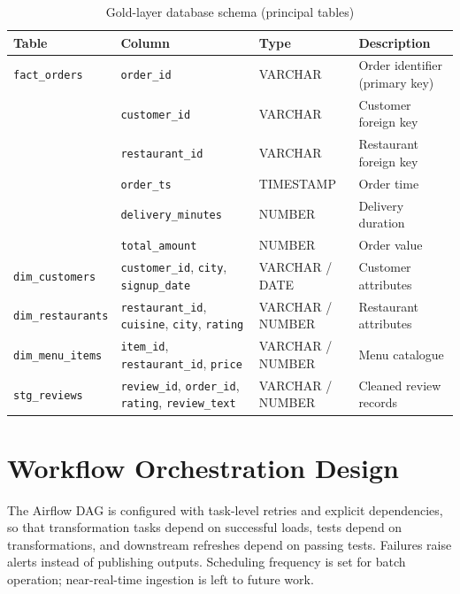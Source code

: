 \documentclass[12pt,a4paper]{report}
\begin{document}
\begin{table}[htbp]
\centering
\caption{Gold-layer database schema (principal tables)}
\label{tab:schema}
\small
\begin{tabular}{@{}p{3.0cm}p{3.6cm}p{2.3cm}p{3.7cm}@{}}
\toprule
\textbf{Table} & \textbf{Column} & \textbf{Type} & \textbf{Description} \\
\midrule
\texttt{fact\_orders} & \texttt{order\_id} & VARCHAR & Order identifier (primary key) \\
 & \texttt{customer\_id} & VARCHAR & Customer foreign key \\
 & \texttt{restaurant\_id} & VARCHAR & Restaurant foreign key \\
 & \texttt{order\_ts} & TIMESTAMP & Order time \\
 & \texttt{delivery\_minutes} & NUMBER & Delivery duration \\
 & \texttt{total\_amount} & NUMBER & Order value \\
\midrule
\texttt{dim\_customers} & \texttt{customer\_id}, \texttt{city}, \texttt{signup\_date} & VARCHAR / DATE & Customer attributes \\
\midrule
\texttt{dim\_restaurants} & \texttt{restaurant\_id}, \texttt{cuisine}, \texttt{city}, \texttt{rating} & VARCHAR / NUMBER & Restaurant attributes \\
\midrule
\texttt{dim\_menu\_items} & \texttt{item\_id}, \texttt{restaurant\_id}, \texttt{price} & VARCHAR / NUMBER & Menu catalogue \\
\midrule
\texttt{stg\_reviews} & \texttt{review\_id}, \texttt{order\_id}, \texttt{rating}, \texttt{review\_text} & VARCHAR / NUMBER & Cleaned review records \\
\bottomrule
\end{tabular}
\end{table}

\section{Workflow Orchestration Design}
The Airflow DAG is configured with task-level retries and explicit dependencies, so that transformation tasks depend on successful loads, tests depend on transformations, and downstream refreshes depend on passing tests. Failures raise alerts instead of publishing outputs. Scheduling frequency is set for batch operation; near-real-time ingestion is left to future work.
\end{document}
